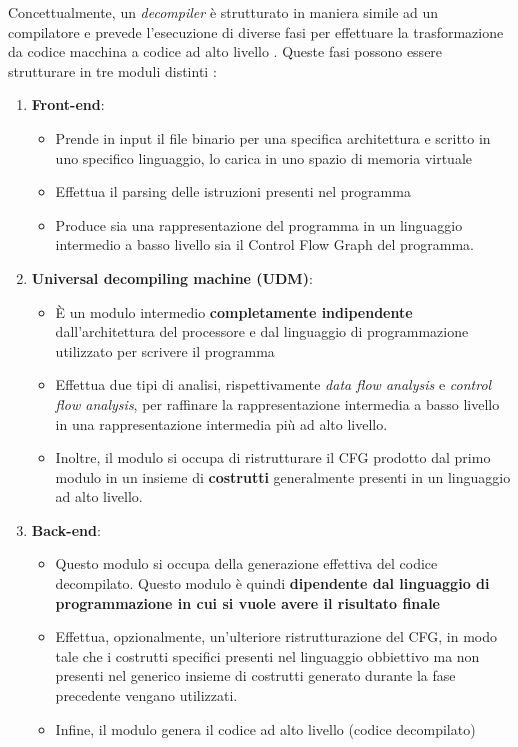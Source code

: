 \documentclass[../main.tex]{subfiles}
\begin{document}
\newpage \noindent
Concettualmente, un \textit{decompiler} è strutturato in maniera simile ad un compilatore e prevede l'esecuzione di diverse fasi per effettuare la trasformazione da codice macchina a codice ad alto livello \cite{Cifuentes1994ReverseCT}. Queste fasi possono essere strutturare in tre moduli distinti \cite{Cifuentes1995DecompilationOB}:
\begin{enumerate}
    \item \textbf{Front-end}:
    \begin{itemize}
        \item Prende in input il file binario per una specifica architettura e scritto in uno specifico linguaggio, lo carica in uno spazio di memoria virtuale
        \item Effettua il parsing delle istruzioni presenti nel programma
        \item Produce sia una rappresentazione del programma in un linguaggio intermedio a basso livello sia il Control Flow Graph del programma.
    \end{itemize}
    \item \textbf{Universal decompiling machine (UDM)}:
    \begin{itemize}
        \item È un modulo intermedio \textbf{completamente indipendente} dall'architettura del processore e dal linguaggio di programmazione utilizzato per scrivere il programma
        \item Effettua due tipi di analisi, rispettivamente \textit{data flow analysis} e \textit{control flow analysis}, per raffinare la rappresentazione intermedia a basso livello in una rappresentazione intermedia più ad alto livello. 
        \item Inoltre, il modulo si occupa di ristrutturare il CFG prodotto dal primo modulo in un insieme di \textbf{costrutti} generalmente presenti in un linguaggio ad alto livello.
    \end{itemize}
    \item \textbf{Back-end}:
    \begin{itemize}
        \item Questo modulo si occupa della generazione effettiva del codice decompilato. Questo modulo è quindi \textbf{dipendente dal linguaggio di programmazione in cui si vuole avere il risultato finale}
        \item Effettua, opzionalmente, un'ulteriore ristrutturazione del CFG, in modo tale che i costrutti specifici presenti nel linguaggio obbiettivo ma non presenti nel generico insieme di costrutti generato durante la fase precedente vengano utilizzati.
        \item Infine, il modulo genera il codice ad alto livello (codice decompilato)
    \end{itemize}
\end{enumerate}
\end{document}
